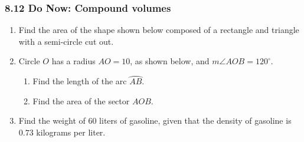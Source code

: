 \documentclass[12pt, twoside]{article}
\begin{document}
\subsubsection*{8.12 Do Now: Compound volumes}
 \begin{enumerate}
  \item Find the area of the shape shown below composed of a rectangle and triangle with a semi-circle cut out.
    \begin{flushright}
  \end{flushright} \vspace{2cm}
  
  \item Circle $O$ has a radius $AO=10$, as shown below, and $m\angle AOB=120^\circ$.
  \begin{enumerate}
    \item Find the length of the arc $\wideparen{AB}$. %
      \begin{flushright}
    \end{flushright}
  \item Find the area of the sector $AOB$.
\end{enumerate} \vspace{3cm}

\item Find the weight of $60$ liters of gasoline, given that the density of gasoline is $0.73$ kilograms per liter.


\end{enumerate}
\end{document}
